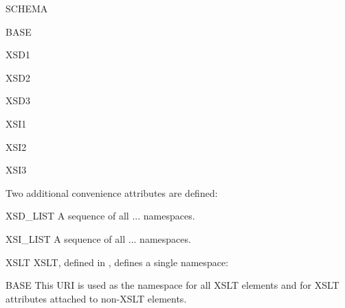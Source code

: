 \documentclass{howto}
\begin{document}
\begin{classdesc*}{SCHEMA}

  \begin{memberdesc}{BASE}
  \end{memberdesc}

  \begin{memberdesc}{XSD1}
  \end{memberdesc}

  \begin{memberdesc}{XSD2}
  \end{memberdesc}

  \begin{memberdesc}{XSD3}
  \end{memberdesc}

  \begin{memberdesc}{XSI1}
  \end{memberdesc}

  \begin{memberdesc}{XSI2}
  \end{memberdesc}

  \begin{memberdesc}{XSI3}
  \end{memberdesc}

  Two additional convenience attributes are defined:

  \begin{memberdesc}{XSD_LIST}
    A sequence of all ... namespaces.
  \end{memberdesc}

  \begin{memberdesc}{XSI_LIST}
    A sequence of all ... namespaces.
  \end{memberdesc}
\end{classdesc*}


\begin{classdesc*}{XSLT}
  XSLT, defined in , defines a single namespace:

  \begin{memberdesc}{BASE}
    This URI is used as the namespace for all XSLT elements and for
    XSLT attributes attached to non-XSLT elements.
  \end{memberdesc}
\end{classdesc*}


\end{document}

